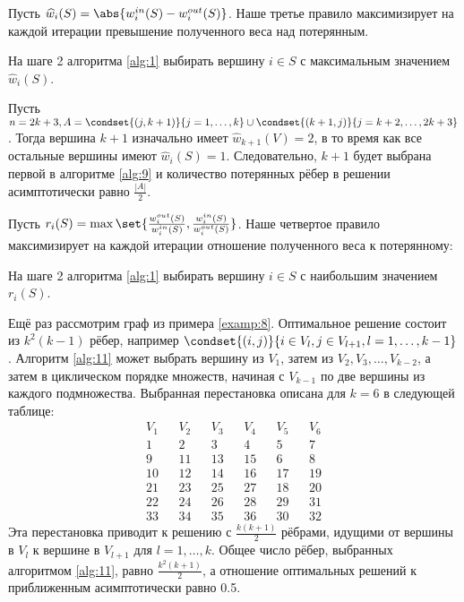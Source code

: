 \documentclass[a4paper, 12pt, oneside]{extarticle}  %
\begin{document}
Пусть $\widehat{w}_i(S) = \abs{w_i^{in}(S) - w_i^{out}(S)}$. Наше третье правило максимизирует на каждой итерации превышение полученного веса над потерянным.

\begin{algo}\label{alg:9}
  На шаге 2 алгоритма \ref{alg:1} выбирать вершину $i \in S$ с максимальным значением $\widehat{w}_i(S)$.
\end{algo}

\begin{example}
  Пусть $n=2k+3, A=\condset{(j, k+1)}{ j=1,\ldots,k} \cup \condset{(k+1,j)}{j=k+2,\ldots, 2k+3}$. Тогда вершина $k+1$ изначально имеет $\widehat{w}_{k+1}(V)=2$, в то время как все остальные вершины имеют $\widehat{w}_i(S)=1$. Следовательно, $k+1$ будет выбрана первой в алгоритме \ref{alg:9} и количество потерянных рёбер в решении асимптотически равно $\frac{|A|}{2}$.
\end{example}

Пусть $r_i(S) = \max\set{\frac{w_i^{out}(S)}{w_i^{in}(S)}, \frac{w_i^{in}(S)}{w_i^{out}(S)}}$. Наше четвертое правило максимизирует на каждой итерации отношение полученного веса к потерянному:

\begin{algo}\label{alg:11}
  На шаге 2 алгоритма \ref{alg:1} выбирать вершину $i \in S$ с наибольшим значением $r_i(S)$.
\end{algo}

\begin{example}
  Ещё раз рассмотрим граф из примера \ref{examp:8}. Оптимальное решение состоит из $k^2(k-1)$
  рёбер, например $\condset{(i, j)}{i\in V_l, j \in V_{l+1}, l=1,\ldots, k-1}$. Алгоритм \ref{alg:11} может выбрать вершину из $V_1$, затем из $V_2, V_3,\ldots, V_{k-2}$, а затем в циклическом порядке множеств, начиная с $V_{k-1}$ по две вершины из каждого подмножества. Выбранная перестановка описана для $k=6$ в следующей таблице:
  \begin{align*}
    V_1 &  & V_2 &  & V_3 &  & V_4 &  & V_5 &  & V_6 \\
    1   &  & 2   &  & 3   &  & 4   &  & 5   &  & 7   \\
    9   &  & 11  &  & 13  &  & 15  &  & 6   &  & 8   \\
    10  &  & 12  &  & 14  &  & 16  &  & 17  &  & 19  \\
    21  &  & 23  &  & 25  &  & 27  &  & 18  &  & 20  \\
    22  &  & 24  &  & 26  &  & 28  &  & 29  &  & 31  \\
    33  &  & 34  &  & 35  &  & 36  &  & 30  &  & 32
  \end{align*}
  Эта перестановка приводит к решению с $\frac{k(k+1)}{2}$ рёбрами, идущими от вершины в $V_l$ к вершине в
  $V_{l+1}$ для $l=1,\ldots,k$. Общее число рёбер, выбранных алгоритмом \ref{alg:11}, равно $\frac{k^2(k+1)}{2}$, а отношение оптимальных решений к приближенным асимптотически равно 0.5.
\end{example}
\end{document}
